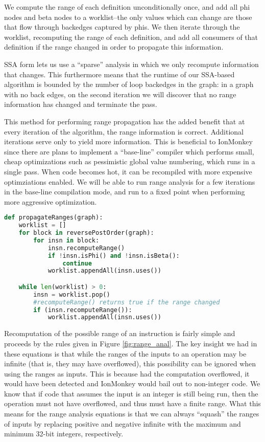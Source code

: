 \documentclass{article}
\begin{document}
We compute the range of each definition unconditionally once, and add all phi
nodes and beta nodes to a worklist--the only values which can change are those
that flow through backedges captured by phis. We then iterate through the
worklist, recomputing the range of each definition, and add all consumers of
that definition if the range changed in order to propagate this information.

SSA form lets us use a ``sparse'' analysis in which we only recompute
information that changes. This furthermore means that the runtime of our
SSA-based algorithm is bounded by the number of loop backedges in the graph: in
a graph with no back edges, on the second iteration we will discover that no
range information has changed and terminate the pass.

This method for performing range propagation has the added benefit that at
every iteration of the algorithm, the range information is correct. Additional
iterations serve only to yield more information. This is beneficial to
IonMonkey since there are plans to implement a ``base-line'' compiler which
performs small, cheap optimizations such as pessimistic global value numbering,
which runs in a single pass. When code becomes hot, it can be recompiled with
more expensive optimziations enabled. We will be able to run range analysis for
a few iterations in the base-line compilation mode, and run to a fixed point
when performing more aggressive optimization.

\begin{lstlisting}[language=Python,
                   caption={Pseudocode algorithm for propagating range information},
                   label={lst:propagate_ranges}]
def propagateRanges(graph):
    worklist = []
    for block in reversePostOrder(graph):
        for insn in block:
            insn.recomputeRange()
            if !insn.isPhi() and !insn.isBeta():
                continue
            worklist.appendAll(insn.uses())

    while len(worklist) > 0:
        insn = worklist.pop()
        #recomputeRange() returns true if the range changed
        if (insn.recomputeRange()):
            worklist.appendAll(insn.uses())
\end{lstlisting}

Recomputation of the possible range of an instruction is fairly simple
and proceeds by the rules given in Figure \ref{fig:range_anal}. The
key insight we had in these equations is that while the ranges of the
inputs to an operation may be infinite (that is, they may have
overflowed), this possibility can be ignored when using the ranges as
inputs. This is because had the computation overflowed, it would have
been detected and IonMonkey would bail out to non-integer code. We
know that if code that assumes the input is an integer is still being
run, then the operation must not have overflowed, and thus must have a
finite range. What this means for the range analysis equations is that
we can always ``squash'' the ranges of inputs by replacing positive
and negative infinite with the maximum and minimum 32-bit integers,
respectively.
\end{document}
